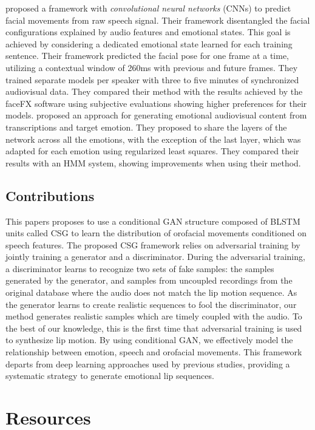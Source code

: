 \documentclass[10pt,journal,compsoc]{IEEEtran}
\begin{document}
\citet{Karras_2017} proposed a framework with \emph{convolutional neural networks} (CNNs) to predict facial movements from raw speech signal. Their framework disentangled the facial configurations explained by audio features and emotional states. This goal is achieved by considering a dedicated emotional state learned for each training sentence. Their framework predicted the facial pose for one frame at a time, utilizing a contextual window of 260ms with previous and future frames. They trained separate models per speaker with three to five minutes of synchronized audiovisual data. They compared their method with the results achieved by the faceFX software using subjective evaluations showing higher preferences for their models. \citet{Parker_2017} proposed an approach for generating emotional audiovisual content from transcriptions and target emotion. They proposed to share the layers of the network across all the emotions, with the exception of the last layer, which was adapted for each emotion using regularized least squares. They compared their results with an HMM system, showing improvements when using their method.

\subsection{Contributions}
\label{ssec:contributions}

This papers proposes to use a conditional GAN structure composed of BLSTM units called CSG to learn the distribution of orofacial movements conditioned on speech features. The proposed CSG framework relies on adversarial training by jointly training a generator and a discriminator. During the adversarial training, a discriminator learns to recognize two sets of fake samples: the samples generated by the generator, and samples from uncoupled recordings from the original database where the audio does not match the lip motion sequence. As the generator learns to create realistic sequences to fool the discriminator, our method generates realistic samples which are timely coupled with the audio. To the best of our knowledge, this is the first time that adversarial training is used to synthesize lip motion. By using conditional GAN, we effectively model the relationship between emotion, speech and orofacial movements. This framework departs from deep learning approaches used by previous studies, providing a systematic strategy to generate emotional lip sequences. 

\section{Resources}
\label{sec:resources}
\end{document}
